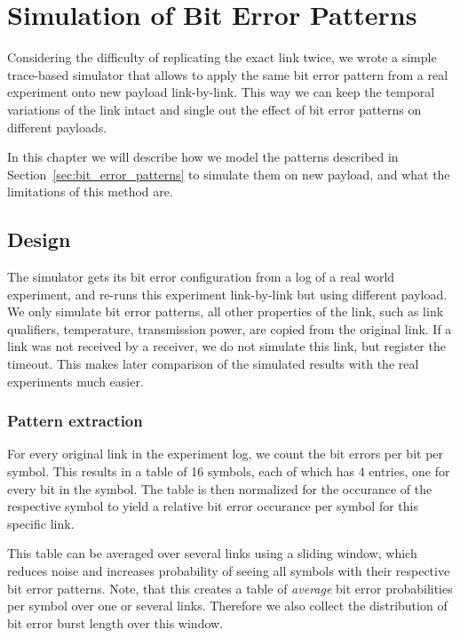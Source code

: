 \chapter{Simulation of Bit Error Patterns}

Considering the difficulty of replicating the exact link twice, we wrote a simple trace-based simulator that allows to apply the same bit error pattern from a real experiment onto new payload link-by-link.
This way we can keep the temporal variations of the link intact and single out the effect of bit error patterns on different payloads.

In this chapter we will describe how we model the patterns described in Section~\ref{sec:bit_error_patterns} to simulate them on new payload, and what the limitations of this method are.

\section{Design}

The simulator gets its bit error configuration from a log of a real world experiment, and re-runs this experiment link-by-link but using different payload.
We only simulate bit error patterns, all other properties of the link, such as link qualifiers, temperature, transmission power, are copied from the original link.
If a link was not received by a receiver, we do not simulate this link, but register the timeout.
This makes later comparison of the simulated results with the real experiments much easier.

\subsection{Pattern extraction}

For every original link in the experiment log, we count the bit errors per bit per symbol.
This results in a table of 16 symbols, each of which has 4 entries, one for every bit in the symbol.
The table is then normalized for the occurance of the respective symbol to yield a relative bit error occurance per symbol for this specific link.

This table can be averaged over several links using a sliding window, which reduces noise and increases probability of seeing all symbols with their respective bit error patterns.
Note, that this creates a table of \emph{average} bit error probabilities per symbol over one or several links.
Therefore we also collect the distribution of bit error burst length over this window.

